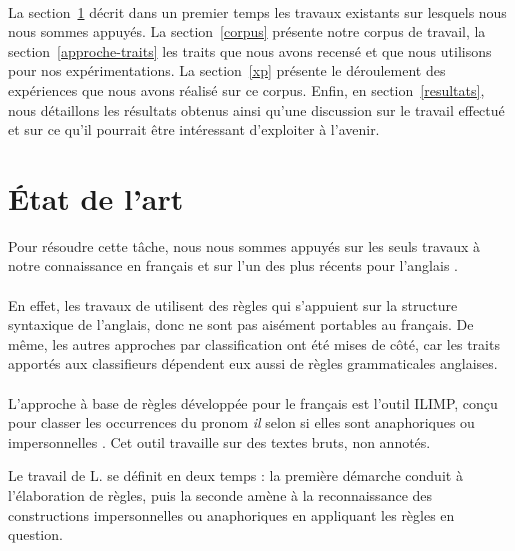\documentclass[a4paper,12pt]{article}
\begin{document}
\paragraph{}
La section~\ref{etat-art} décrit dans un premier temps les travaux existants sur lesquels nous nous sommes appuyés. La section~\ref{corpus} présente notre corpus de travail, la section~\ref{approche-traits} les traits que nous avons recensé et que nous utilisons pour nos expérimentations.
La section~\ref{xp} présente le déroulement des expériences que nous avons réalisé sur ce corpus.
Enfin, en section~\ref{resultats}, nous détaillons les résultats obtenus ainsi qu'une discussion sur le travail effectué et sur ce qu'il pourrait être intéressant d'exploiter à l'avenir.


\section{État de l'art}
\label{etat-art}

Pour résoudre cette tâche, nous nous sommes appuyés sur les seuls travaux à notre connaissance en français \citep{danlos-ilimp-taln2005} et sur l'un des plus récents pour l'anglais \citep{Bergsma-11}.

\paragraph{}
En effet, les travaux de \citet{Lappin-1994-APA-203987.203989} utilisent des règles qui s'appuient sur la structure syntaxique de l'anglais, donc ne sont pas aisément portables au français. De même, les autres approches par classification ont été mises de côté, car les traits apportés aux classifieurs dépendent eux aussi de règles grammaticales anglaises.

\paragraph{}
L'approche à base de règles développée pour le français est l'outil ILIMP, conçu pour classer les occurrences du pronom \og{}\textit{il}\fg{} selon si elles sont anaphoriques ou impersonnelles \citep{danlos-ilimp-taln2005}. Cet outil travaille sur des textes bruts, non annotés.

Le travail de L. \citeauthor{danlos-ilimp-taln2005} se définit en deux temps : la première démarche conduit à l'élaboration de règles, puis la seconde amène à la reconnaissance des constructions impersonnelles ou anaphoriques en appliquant les règles en question.
\end{document}
